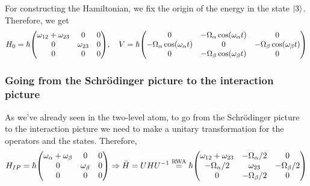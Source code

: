 For constructing the Hamiltonian, we fix the origin of the energy in the state $\ket{3}$. Therefore, we get
\begin{align*}
	H_{0} = \hbar \mqty( \omega_{12} + \omega_{23} & 0 & 0 \\ 0 & \omega_{23} & 0 \\ 0 & 0 & 0 ) \qc V = \hbar \mqty( 0 & - \Omega_{\alpha} \cos(\omega_{\alpha} t) & 0 \\ - \Omega_{\alpha} \cos(\omega_{\alpha} t) & 0 & - \Omega_{\beta} \cos(\omega_{\beta} t) \\ 0 & - \Omega_{\beta} \cos(\omega_{\beta} t) & 0 )
\end{align*}

\subsubsection*{Going from the Schrödinger picture to the interaction picture}
As we've already seen in the two-level atom, to go from the Schrödinger picture to the interaction picture we need to make a unitary transformation for the operators and the states. Therefore,
\begin{align*}
	H_{IP} = \hbar \mqty( \omega_{\alpha} + \omega_{\beta} & 0 & 0 \\ 0 & \omega_{\beta} & 0 \\ 0 & 0 & 0 ) \Rightarrow \bar{H} = U H U^{-1} \overset{\text{RWA}}{=} \hbar \mqty( \omega_{12} + \omega_{23} & -\Omega_{\alpha}/2 & 0 \\ -\Omega_{\alpha}/2 & \omega_{23} & -\Omega_{\beta}/2 \\ 0 & -\Omega_{\beta}/2 & 0 )
\end{align*}

